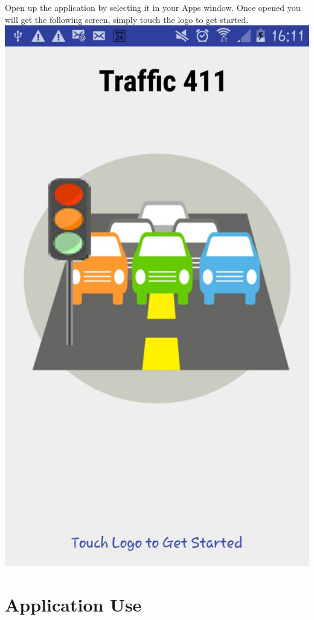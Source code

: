 \documentclass[a4paper,12pt]{article}
\begin{document}
Open up the application by selecting it in your Apps window. Once opened you will get the following screen, simply touch the logo to get started.
\includegraphics[width=\textwidth]{images/splashScreen.jpg}

\section{Application Use}
\end{document}
